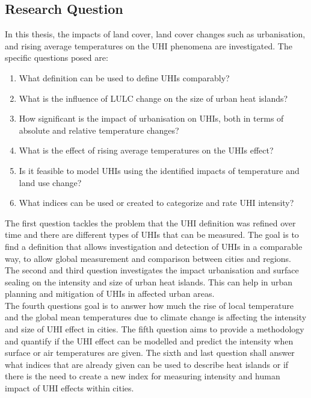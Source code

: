 \documentclass[12pt,a4paper, english,twoside]{article}
\begin{document}
 \subsection{Research Question}

  In this thesis, the impacts of land cover, land cover changes such as urbanisation, and rising average temperatures on the \gls{UHI} phenomena are investigated.
  The specific questions posed are:
  \begin{enumerate}
    \item What definition can be used to define \glspl{UHI} comparably?\label{q1}
    \item What is the influence of \gls{LULC} change on the size of urban heat islands?\label{q2}
    \item How significant is the impact of urbanisation on \glspl{UHI}, both in terms of absolute and relative temperature changes?\label{q3}
    \item What is the effect of rising average temperatures on the \glspl{UHI} effect?\label{q4}
    \item Is it feasible to model \glspl{UHI} using the identified impacts of temperature and land use change?\label{q5}
    \item What indices can be used or created to categorize and rate \gls{UHI} intensity?\label{q6}
  \end{enumerate}
  The first question tackles the problem that the \gls{UHI} definition was refined over time and there are different types of \glspl{UHI} that can be measured. 
  The goal is to find a definition that allows investigation and detection of \glspl{UHI} in a comparable way, to allow global measurement and comparison between cities and regions.\\ 
  The second and third question investigates the impact urbanisation and surface sealing on the intensity and size of urban heat islands. 
  This can help in urban planning and mitigation of \glspl{UHI} in affected urban areas.\\ 
  The fourth questions goal is to answer how much the rise of local temperature and the global mean temperatures due to climate change is affecting the intensity and size of \gls{UHI} effect in cities.%
  The fifth question aims to provide a methodology and quantify if the \gls{UHI} effect can be modelled and predict the intensity when surface or air temperatures are given. 
  The sixth and last question shall answer what indices that are already given can be used to describe heat islands or if there is the need to create a new index for measuring intensity and human impact of \gls{UHI} effects within cities.
\end{document}
